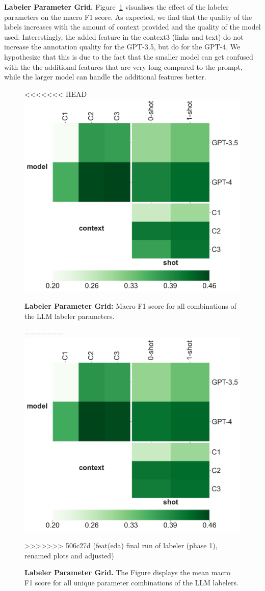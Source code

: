 \textbf{Labeler Parameter Grid.} Figure~\ref{fig:labelers-grid} visualises the effect of the labeler parameters on the macro F1 score. As expected, we find that the quality of the labels increases with the amount of context provided and the quality of the model used. 
Interestingly, the added feature in the context3 (links and text) do not increase the annotation quality for the GPT-3.5, but do for the GPT-4. 
We hypothesize that this is due to the fact that the smaller model can get confused with the the additional features that are very long compared to the prompt, while the larger model can handle the additional features better. 


\begin{figure}[!h]
    \centering
<<<<<<< HEAD
    \includegraphics[width=.8\columnwidth]{./figures/labelers-grid.pdf}
    \caption{\textbf{Labeler Parameter Grid:} Macro F1 score for all combinations of the LLM labeler parameters.}

=======
    \includegraphics[width=.8\columnwidth]{figures/labeler-grid.pdf}
    \caption{\textbf{Labeler Parameter Grid.} The Figure displays the mean macro F1 score for all unique parameter combinations of the LLM labelers.}
>>>>>>> 506c27d (feat(eda) final run of labeler (phase 1), renamed plots and adjusted)
    \label{fig:labelers-grid}
\end{figure}


